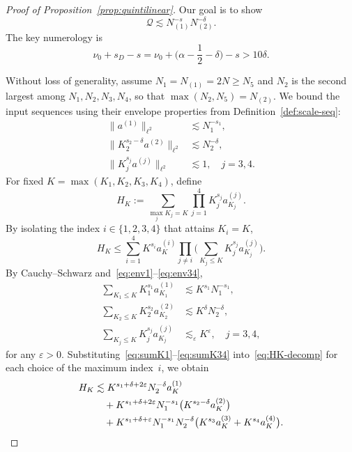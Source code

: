 \documentclass[10pt,a4paper]{amsart}
\renewcommand{\epsilon}{\varepsilon}
\begin{document}
\begin{proof}[Proof of Proposition~\ref{prop:quintilinear}]
Our goal is to show
\begin{equation}\label{eq:target-Q}
	\mathcal{Q}\lesssim N_{(1)}^{-s}N_{(2)}^{-\delta}.
\end{equation}
The key numerology is
\begin{equation}\label{eq:numerology}
	\nu_0 + s_D - s = \nu_0 + \Big(\alpha - \frac{1}{2} - \delta\Big) - s > 10\delta.
\end{equation}

Without loss of generality, assume $N_1 = N_{(1)} = 2N \ge N_5$ and $N_2$ is the second largest among $N_1,N_2,N_3,N_4$, so that $\max(N_2,N_5)=N_{(2)}$. We bound the input sequences using their envelope properties from Definition~\ref{def:scale-seq}:
\begin{align}
	\|a^{(1)}\|_{\ell^2} &\lesssim N_1^{-s_1}, \label{eq:env1} \\
	\|K_2^{s_2-\delta} a^{(2)}\|_{\ell^2} &\lesssim N_2^{-\delta}, \label{eq:env2} \\
	\|K_j^{s_j} a^{(j)}\|_{\ell^2} &\lesssim 1, \quad j=3,4. \label{eq:env34}
\end{align}
For fixed $K=\max(K_1,K_2,K_3,K_4)$, define
\[
H_K := \sum_{\max_j K_j=K} \prod_{j=1}^4 K_j^{s_j} a_{K_j}^{(j)}.
\]
By isolating the index $i \in \{1,2,3,4\}$ that attains $K_i = K$,
\begin{equation}\label{eq:HK-decomp}
	H_K \le \sum_{i=1}^4 K^{s_i} a_K^{(i)} \prod_{j \neq i} \Big(\sum_{K_j \le K} K_j^{s_j} a_{K_j}^{(j)}\Big).
\end{equation}
By Cauchy--Schwarz and~\eqref{eq:env1}--\eqref{eq:env34},
\begin{align}
	\sum_{K_1 \le K} K_1^{s_1} a_{K_1}^{(1)} &\lesssim K^{s_1} N_1^{-s_1}, \label{eq:sumK1} \\
	\sum_{K_2 \le K} K_2^{s_2} a_{K_2}^{(2)} &\lesssim K^{\delta} N_2^{-\delta}, \label{eq:sumK2} \\
	\sum_{K_j \le K} K_j^{s_j} a_{K_j}^{(j)} &\lesssim_{\epsilon} K^{\epsilon},\quad j=3,4, \label{eq:sumK34}
\end{align}
for any $\epsilon > 0$. Substituting~\eqref{eq:sumK1}--\eqref{eq:sumK34} into~\eqref{eq:HK-decomp} for each choice of the maximum index~$i$, we obtain
\begin{align}
	H_K &\lesssim K^{s_1+\delta+2\epsilon} N_2^{-\delta} a_K^{(1)} \notag \\
	&\quad + K^{s_1+\delta+2\epsilon} N_1^{-s_1} \big(K^{s_2-\delta} a_K^{(2)}\big) \notag \\
	&\quad + K^{s_1+\delta+\epsilon} N_1^{-s_1} N_2^{-\delta} \big(K^{s_3} a_K^{(3)} + K^{s_4} a_K^{(4)}\big). \label{eq:HK-bound}

\end{align}
\end{proof}
\end{document}
